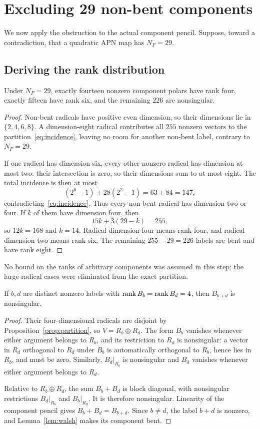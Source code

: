 \section{Excluding 29 non-bent components}\label{sec:finish}
We now apply the obstruction to the actual component pencil. Suppose, toward a contradiction, that a quadratic APN map has $N_F=29$.

\subsection{Deriving the rank distribution}
\begin{lemma}\label{lem:profile29}
Under $N_F=29$, exactly fourteen nonzero component polars have rank four, exactly fifteen have rank six, and the remaining $226$ are nonsingular.
\end{lemma}
\begin{proof}
Non-bent radicals have positive even dimension, so their dimensions lie in $\{2,4,6,8\}$. A dimension-eight radical contributes all $255$ nonzero vectors to the partition~\eqref{eq:incidence}, leaving no room for another non-bent label, contrary to $N_F=29$.

If one radical has dimension six, every other nonzero radical has dimension at most two: their intersection is zero, so their dimensions sum to at most eight. The total incidence is then at most
\[
(2^6-1)+28(2^2-1)=63+84=147,
\]
contradicting~\eqref{eq:incidence}. Thus every non-bent radical has dimension two or four. If $k$ of them have dimension four, then
\[
15k+3(29-k)=255,
\]
so $12k=168$ and $k=14$. Radical dimension four means rank four, and radical dimension two means rank six. The remaining $255-29=226$ labels are bent and have rank eight.
\end{proof}
No bound on the ranks of arbitrary components was assumed in this step; the large-radical cases were eliminated from the exact partition.

\begin{lemma}\label{lem:pair-sum}
If $b,d$ are distinct nonzero labels with $\operatorname{rank} B_b=\operatorname{rank} B_d=4$, then $B_{b+d}$ is nonsingular.
\end{lemma}
\begin{proof}
Their four-dimensional radicals are disjoint by Proposition~\ref{prop:partition}, so $V=R_b\oplus R_d$. The form $B_b$ vanishes whenever either argument belongs to $R_b$, and its restriction to $R_d$ is nonsingular: a vector in $R_d$ orthogonal to $R_d$ under $B_b$ is automatically orthogonal to $R_b$, hence lies in $R_b$, and must be zero. Similarly, $B_d|_{R_b}$ is nonsingular and $B_d$ vanishes whenever either argument belongs to $R_d$.

Relative to $R_b\oplus R_d$, the sum $B_b+B_d$ is block diagonal, with nonsingular restrictions $B_d|_{R_b}$ and $B_b|_{R_d}$. It is therefore nonsingular. Linearity of the component pencil gives $B_b+B_d=B_{b+d}$. Since $b\ne d$, the label $b+d$ is nonzero, and Lemma~\ref{lem:walsh} makes its component bent.
\end{proof}


